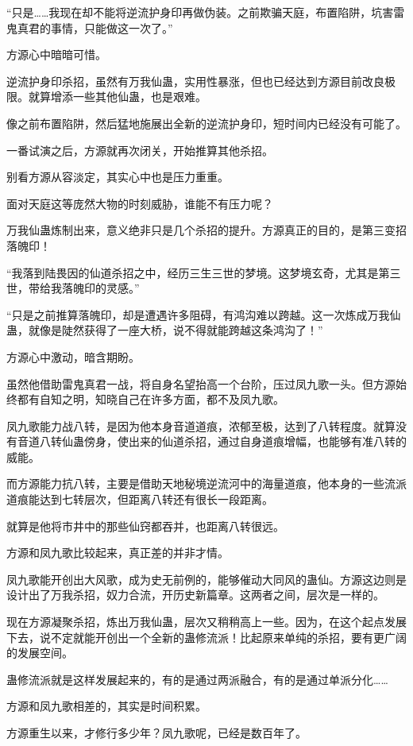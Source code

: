 \begin{this_body}
“只是……我现在却不能将逆流护身印再做伪装。之前欺骗天庭，布置陷阱，坑害雷鬼真君的事情，只能做这一次了。”

方源心中暗暗可惜。

逆流护身印杀招，虽然有万我仙蛊，实用性暴涨，但也已经达到方源目前改良极限。就算增添一些其他仙蛊，也是艰难。

像之前布置陷阱，然后猛地施展出全新的逆流护身印，短时间内已经没有可能了。

一番试演之后，方源就再次闭关，开始推算其他杀招。

别看方源从容淡定，其实心中也是压力重重。

面对天庭这等庞然大物的时刻威胁，谁能不有压力呢？

万我仙蛊炼制出来，意义绝非只是几个杀招的提升。方源真正的目的，是第三变招落魄印！

“我落到陆畏因的仙道杀招之中，经历三生三世的梦境。这梦境玄奇，尤其是第三世，带给我落魄印的灵感。”

“只是之前推算落魄印，却是遭遇许多阻碍，有鸿沟难以跨越。这一次炼成万我仙蛊，就像是陡然获得了一座大桥，说不得就能跨越这条鸿沟了！”

方源心中激动，暗含期盼。

虽然他借助雷鬼真君一战，将自身名望抬高一个台阶，压过凤九歌一头。但方源始终都有自知之明，知晓自己在许多方面，都不及凤九歌。

凤九歌能力战八转，是因为他本身音道道痕，浓郁至极，达到了八转程度。就算没有音道八转仙蛊傍身，使出来的仙道杀招，通过自身道痕增幅，也能够有准八转的威能。

而方源能力抗八转，主要是借助天地秘境逆流河中的海量道痕，他本身的一些流派道痕能达到七转层次，但距离八转还有很长一段距离。

就算是他将市井中的那些仙窍都吞并，也距离八转很远。

方源和凤九歌比较起来，真正差的并非才情。

凤九歌能开创出大风歌，成为史无前例的，能够催动大同风的蛊仙。方源这边则是设计出了万我杀招，奴力合流，开历史新篇章。这两者之间，层次是一样的。

现在方源凝聚杀招，炼出万我仙蛊，层次又稍稍高上一些。因为，在这个起点发展下去，说不定就能开创出一个全新的蛊修流派！比起原来单纯的杀招，要有更广阔的发展空间。

蛊修流派就是这样发展起来的，有的是通过两派融合，有的是通过单派分化……

方源和凤九歌相差的，其实是时间积累。

方源重生以来，才修行多少年？凤九歌呢，已经是数百年了。


\end{this_body}
